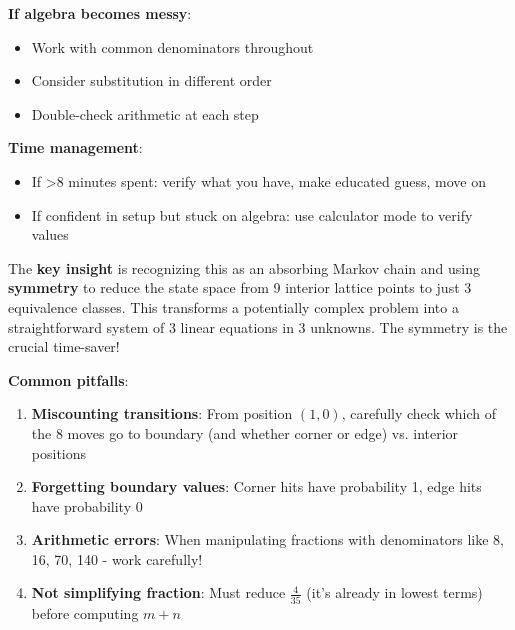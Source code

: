 \documentclass[12pt]{article}
\begin{document}
\begin{roadmapbox}
\textbf{If algebra becomes messy}:
\begin{itemize}[leftmargin=*]
    \item Work with common denominators throughout
    \item Consider substitution in different order
    \item Double-check arithmetic at each step
\end{itemize}

\textbf{Time management}:
\begin{itemize}[leftmargin=*]
    \item If >8 minutes spent: verify what you have, make educated guess, move on
    \item If confident in setup but stuck on algebra: use calculator mode to verify values
\end{itemize}

\end{roadmapbox}

\begin{keyinsightbox}
The \textbf{key insight} is recognizing this as an absorbing Markov chain and using \textbf{symmetry} to reduce the state space from 9 interior lattice points to just 3 equivalence classes. This transforms a potentially complex problem into a straightforward system of 3 linear equations in 3 unknowns. The symmetry is the crucial time-saver!
\end{keyinsightbox}

\begin{warningbox}
\textbf{Common pitfalls}:
\begin{enumerate}
    \item \textbf{Miscounting transitions}: From position $(1,0)$, carefully check which of the 8 moves go to boundary (and whether corner or edge) vs. interior positions
    \item \textbf{Forgetting boundary values}: Corner hits have probability 1, edge hits have probability 0
    \item \textbf{Arithmetic errors}: When manipulating fractions with denominators like 8, 16, 70, 140 - work carefully!
    \item \textbf{Not simplifying fraction}: Must reduce $\frac{4}{35}$ (it's already in lowest terms) before computing $m+n$
\end{enumerate}
\end{warningbox}
\end{document}
